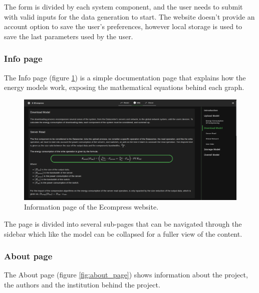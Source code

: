         The form is divided by each system component, and the user needs to submit with valid inputs for the data generation to start. The website doesn't provide an account option to save the user's preferences, however local storage is used to save the last parameters used by the user. 

    \subsubsection{Info page}

        The Info page (figure \ref{fig:info_page}) is a simple documentation page that explains how the energy models work, exposing the mathematical equations behind each graph.

        \begin{figure}[H]
            \centering
            \includegraphics[width=1\textwidth]{figs/web_info_page.png}
            \caption{Information page of the Ecompress website.}
            \label{fig:info_page}
        \end{figure}

        The page is divided into several sub-pages that can be navigated through the sidebar which like the model can be collapsed for a fuller view of the content.

    \subsubsection{About page}

        The About page (figure \ref{fig:about_page}) shows information about the project, the authors and the institution behind the project. 
